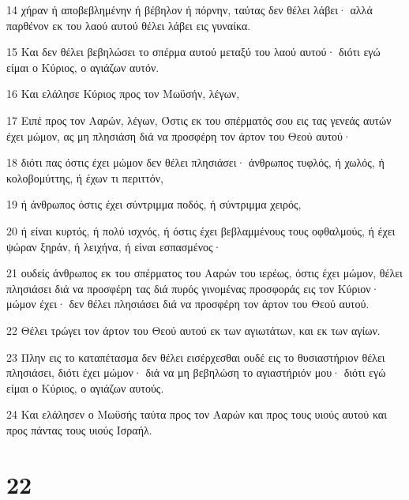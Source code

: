 \par 14 χήραν ή αποβεβλημένην ή βέβηλον ή πόρνην, ταύτας δεν θέλει λάβει· αλλά παρθένον εκ του λαού αυτού θέλει λάβει εις γυναίκα.
\par 15 Και δεν θέλει βεβηλώσει το σπέρμα αυτού μεταξύ του λαού αυτού· διότι εγώ είμαι ο Κύριος, ο αγιάζων αυτόν.
\par 16 Και ελάλησε Κύριος προς τον Μωϋσήν, λέγων,
\par 17 Ειπέ προς τον Ααρών, λέγων, Όστις εκ του σπέρματός σου εις τας γενεάς αυτών έχει μώμον, ας μη πλησιάση διά να προσφέρη τον άρτον του Θεού αυτού·
\par 18 διότι πας όστις έχει μώμον δεν θέλει πλησιάσει· άνθρωπος τυφλός, ή χωλός, ή κολοβομύττης, ή έχων τι περιττόν,
\par 19 ή άνθρωπος όστις έχει σύντριμμα ποδός, ή σύντριμμα χειρός,
\par 20 ή είναι κυρτός, ή πολύ ισχνός, ή όστις έχει βεβλαμμένους τους οφθαλμούς, ή έχει ψώραν ξηράν, ή λειχήνα, ή είναι εσπασμένος·
\par 21 ουδείς άνθρωπος εκ του σπέρματος του Ααρών του ιερέως, όστις έχει μώμον, θέλει πλησιάσει διά να προσφέρη τας διά πυρός γινομένας προσφοράς εις τον Κύριον· μώμον έχει· δεν θέλει πλησιάσει διά να προσφέρη τον άρτον του Θεού αυτού.
\par 22 Θέλει τρώγει τον άρτον του Θεού αυτού εκ των αγιωτάτων, και εκ των αγίων.
\par 23 Πλην εις το καταπέτασμα δεν θέλει εισέρχεσθαι ουδέ εις το θυσιαστήριον θέλει πλησιάσει, διότι έχει μώμον· διά να μη βεβηλώση το αγιαστήριόν μου· διότι εγώ είμαι ο Κύριος, ο αγιάζων αυτούς.
\par 24 Και ελάλησεν ο Μωϋσής ταύτα προς τον Ααρών και προς τους υιούς αυτού και προς πάντας τους υιούς Ισραήλ.

\chapter{22}

